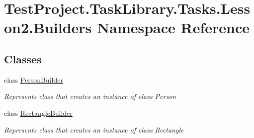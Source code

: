 \hypertarget{namespace_test_project_1_1_task_library_1_1_tasks_1_1_lesson2_1_1_builders}{}\section{Test\+Project.\+Task\+Library.\+Tasks.\+Lesson2.\+Builders Namespace Reference}
\label{namespace_test_project_1_1_task_library_1_1_tasks_1_1_lesson2_1_1_builders}
\subsection*{Classes}
\begin{DoxyCompactItemize}
\item 
class \mbox{\hyperlink{class_test_project_1_1_task_library_1_1_tasks_1_1_lesson2_1_1_builders_1_1_person_builder}{Person\+Builder}}
\begin{DoxyCompactList}\small\item\em Represents class that creates an instance of class Person \end{DoxyCompactList}\item 
class \mbox{\hyperlink{class_test_project_1_1_task_library_1_1_tasks_1_1_lesson2_1_1_builders_1_1_rectangle_builder}{Rectangle\+Builder}}
\begin{DoxyCompactList}\small\item\em Represents class that creates an instance of class Rectangle \end{DoxyCompactList}\end{DoxyCompactItemize}
